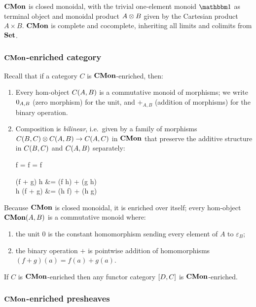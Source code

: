 $\mathbf{CMon}$ is closed monoidal, with the trivial one-element monoid $\One$ as terminal object and monoidal product
$A \otimes B$ given by the Cartesian product $A \times B$. $\mathbf{CMon}$ is complete and cocomplete, inheriting all
limits and colimits from $\mathbf{Set}$.

\subsubsection{$\mathbf{CMon}$-enriched category}

Recall that if a category $C$ is $\mathbf{CMon}$-enriched, then:
\begin{enumerate}
\item Every hom-object ${C}(A,B)$ is a commutative monoid of morphisms; we write $0_{A,B}$ (zero
morphism) for the unit, and $+_{A,B}$ (addition of morphisms) for the binary operation.
\item Composition is \emph{bilinear}, i.e.~given by a family of morphisms ${C}(B,C) \otimes
{C}(A,B) \to {C}(A,C)$ in $\mathbf{CMon}$ that preserve the additive structure in ${C}(B,C)$ and
${C}(A,B)$ separately:

\begin{salign*}
f \comp \zero = f = \zero \comp f
\end{salign*}
\begin{salign*}
(f + g) \comp h &= (f \comp h) + (g \comp h) \\
h \comp (f + g) &= (h \comp f) + (h \comp g)
\end{salign*}
\end{enumerate}

Because $\mathbf{CMon}$ is closed monoidal, it is enriched over itself; every hom-object ${\mathbf{CMon}}(A,B)$ is a
commutative monoid where:

\begin{enumerate}
\item the unit $0$ is the constant homomorphism sending every element of $A$ to $\varepsilon_B$;
\item the binary operation $+$ is pointwise addition of homomorphisms $(f + g)(a) = f(a) + g(a)$.
\end{enumerate}

\begin{proposition}
If $C$ is $\mathbf{CMon}$-enriched then any functor category $[D,C]$ is $\mathbf{CMon}$-enriched.
\end{proposition}

\subsubsection{$\mathbf{CMon}$-enriched presheaves}

